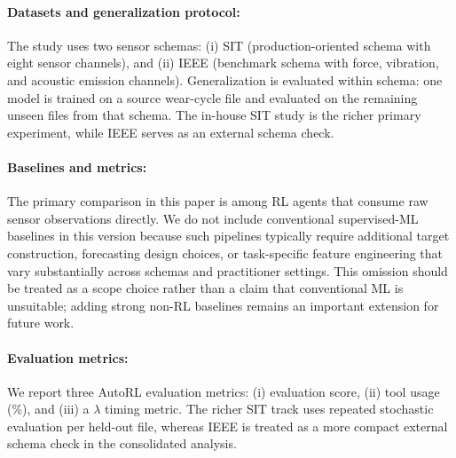 \documentclass[sn-vancouver-num]{sn-jnl}%
\begin{document}
\paragraph{Datasets and generalization protocol:}
The study uses two sensor schemas: (i) SIT (production-oriented schema with eight sensor channels), and (ii) IEEE (benchmark schema with force, vibration, and acoustic emission channels). Generalization is evaluated within schema: one model is trained on a source wear-cycle file and evaluated on the remaining unseen files from that schema. The in-house SIT study is the richer primary experiment, while IEEE serves as an external schema check.

\paragraph{Baselines and metrics:}
\label{sec:metrics}
The primary comparison in this paper is among RL agents that consume raw sensor observations directly. We do not include conventional supervised-ML baselines in this version because such pipelines typically require additional target construction, forecasting design choices, or task-specific feature engineering that vary substantially across schemas and practitioner settings. This omission should be treated as a scope choice rather than a claim that conventional ML is unsuitable; adding strong non-RL baselines remains an important extension for future work.

\paragraph{Evaluation metrics:}
We report three AutoRL evaluation metrics: (i) evaluation score, (ii) tool usage (\%), and (iii) a $\lambda$ timing metric. The richer SIT track uses repeated stochastic evaluation per held-out file, whereas IEEE is treated as a more compact external schema check in the consolidated analysis.
\end{document}
